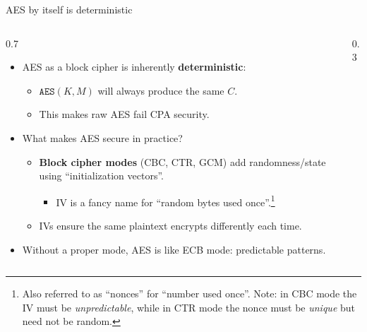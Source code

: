 \ifdefined\PRESENTATION\else\PassOptionsToClass{handout}{beamer}\fi\documentclass[aspectratio=169, lualatex]{beamer}
\begin{document}
\begin{frame}{AES by itself is deterministic}
	\begin{columns}[c]
		\begin{column}{0.7\textwidth}
			\begin{itemize}[<+->]
				\item AES as a block cipher is inherently \textbf{deterministic}:
				      \begin{itemize}
					      \item $\texttt{AES}(K, M)$ will always produce the same $C$.
					      \item This makes raw AES fail CPA security.
				      \end{itemize}
				\item What makes AES secure in practice?
				      \begin{itemize}
					      \item \textbf{Block cipher modes} (CBC, CTR, GCM) add randomness/state using ``initialization vectors''.
					            \begin{itemize}
						            \item IV is a fancy name for ``random bytes used once''.\footnote{Also referred to as ``nonces'' for ``number used once''. Note: in CBC mode the IV must be \emph{unpredictable}, while in CTR mode the nonce must be \emph{unique} but need not be random.}
					            \end{itemize}
					      \item IVs ensure the same plaintext encrypts differently each time.
				      \end{itemize}
				\item Without a proper mode, AES is like ECB mode: predictable patterns.
			\end{itemize}
		\end{column}
		\begin{column}{0.3\textwidth}
			\begin{center}
			\end{center}
		\end{column}
	\end{columns}
\end{frame}
\end{document}
